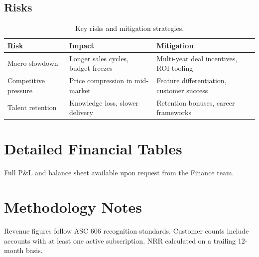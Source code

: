 \documentclass[11pt,a4paper]{article}
\begin{document}
\subsection{Risks}

\begin{table}[htbp]
    \centering
    \caption{Key risks and mitigation strategies.}
    \label{tbl:risks}
    \begin{tabularx}{\textwidth}{lXX}
        \toprule
        \textbf{Risk} & \textbf{Impact} & \textbf{Mitigation} \\
        \midrule
        Macro slowdown & Longer sales cycles, budget freezes & Multi-year deal incentives, ROI tooling \\
        Competitive pressure & Price compression in mid-market & Feature differentiation, customer success \\
        Talent retention & Knowledge loss, slower delivery & Retention bonuses, career frameworks \\
        \bottomrule
    \end{tabularx}
\end{table}

\newpage
\appendix
\section{Detailed Financial Tables}
\label{app:financials}

Full P\&L and balance sheet available upon request from the Finance team.

\section{Methodology Notes}
\label{app:methodology}

Revenue figures follow ASC 606 recognition standards. Customer counts include accounts with at least one active subscription. NRR calculated on a trailing 12-month basis.
\end{document}

